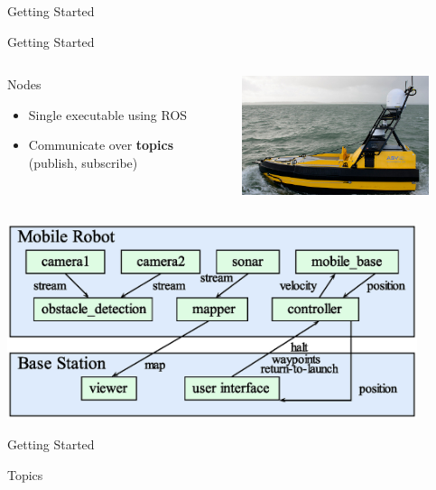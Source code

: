 \documentclass[9pt]{beamer}
\begin{document}
\begin{section}{Getting Started}
\begin{frame}{Getting Started}
\begin{columns}
\begin{column}{0.5\textwidth}
\begin{block}{Nodes}
\begin{itemize}
                        \item Single executable using ROS
                        \item Communicate over \textbf{topics} (publish, subscribe)
                    \end{itemize} 
                \end{block}
            \end{column}
            \begin{column}{0.5\textwidth}
                 \begin{center}
                    \includegraphics[width=0.85\textwidth,trim={0cm 0cm 0cm 0cm},clip]{img/ASV-C-Worker-USV.jpg}
                \end{center}            
            \end{column}    
        \end{columns}
        \begin{center}
            \includegraphics[width=0.9\textwidth,trim={0cm 0cm 0cm 0cm},clip]{img/ros_nodes.eps}
        \end{center}                      
    \end{frame}
    \begin{frame}{Getting Started} \label{frame:topics_messages}
        \begin{block}{Topics}

\end{block}
\end{frame}
\end{section}
\end{document}
